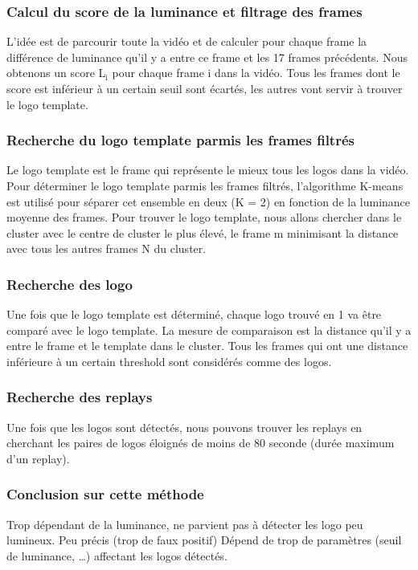 \documentclass[11pt]{article}
\begin{document}
\subsubsection{Calcul du score de la luminance et filtrage des frames}
\label{sec-4-1-1}
L'idée est de parcourir toute la vidéo et de calculer pour chaque frame
la différence de luminance qu'il y a entre ce frame et les 17 frames précédents. 
Nous obtenons un score L$_{\text{i}}$ pour chaque frame i dans la vidéo.
Tous les frames dont le score est inférieur à un certain seuil sont écartés,
les autres vont servir à trouver le logo template.

\subsubsection{Recherche du logo template parmis les frames filtrés}
\label{sec-4-1-2}
Le logo template est le frame qui représente le mieux tous les logos dans la
vidéo. Pour déterminer le logo template parmis les frames filtrés, l'algorithme
K-means est utilisé pour séparer cet ensemble en deux (K = 2) en fonction de la
luminance moyenne des frames. Pour trouver le logo template, nous allons 
chercher dans le cluster avec le centre de cluster le plus élevé, le frame m
minimisant la distance avec tous les autres frames N du cluster. 

\subsubsection{Recherche des logo}
\label{sec-4-1-3}
Une fois que le logo template est déterminé, chaque logo trouvé en 1 va être 
comparé avec le logo template. La mesure de comparaison est la distance qu'il 
y a entre le frame et le template dans le cluster.
Tous les frames qui ont une distance inférieure à un certain threshold sont 
considérés comme des logos.

\subsubsection{Recherche des replays}
\label{sec-4-1-4}
Une fois que les logos sont détectés, nous pouvons trouver les replays en 
cherchant les paires de logos éloignés de moins de 80 seconde (durée 
maximum d'un replay).

\subsubsection{Conclusion sur cette méthode}
\label{sec-4-1-5}
Trop dépendant de la luminance, ne parvient pas à détecter les logo 
peu lumineux. 
Peu précis (trop de faux positif)
Dépend de trop de paramètres (seuil de luminance, \ldots{}) affectant 
les logos détectés.
\end{document}
